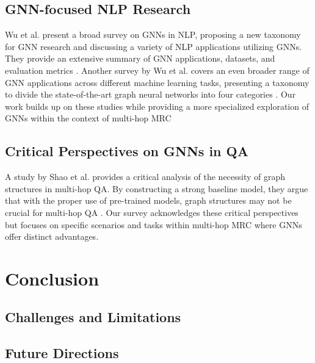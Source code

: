 \documentclass[sigplan,screen]{acmart}
\begin{document}
\subsection{GNN-focused NLP Research}

Wu et al. present a broad survey on GNNs in NLP, proposing a new taxonomy for GNN research and discussing a variety of NLP applications utilizing GNNs. 
They provide an extensive summary of GNN applications, datasets, and evaluation metrics \cite{RN23}. Another survey by Wu et al. covers an even broader range of GNN applications 
across different machine learning tasks, presenting a taxonomy to divide the state-of-the-art graph neural networks into four categories \cite{RN16}. Our work builds up on these studies while 
providing a more specialized exploration of GNNs within the context of multi-hop MRC 

\subsection{Critical Perspectives on GNNs in QA}
A study by Shao et al. provides a critical analysis of the necessity of graph structures in multi-hop QA. By constructing a strong baseline model, they argue that with the proper 
use of pre-trained models, graph structures may not be crucial for multi-hop QA \cite{RN127}. Our survey acknowledges these critical perspectives but focuses on specific scenarios and tasks 
within multi-hop MRC where GNNs offer distinct advantages.


\section{Conclusion}

\subsection{Challenges and Limitations}

\subsection{Future Directions}



\end{document}
